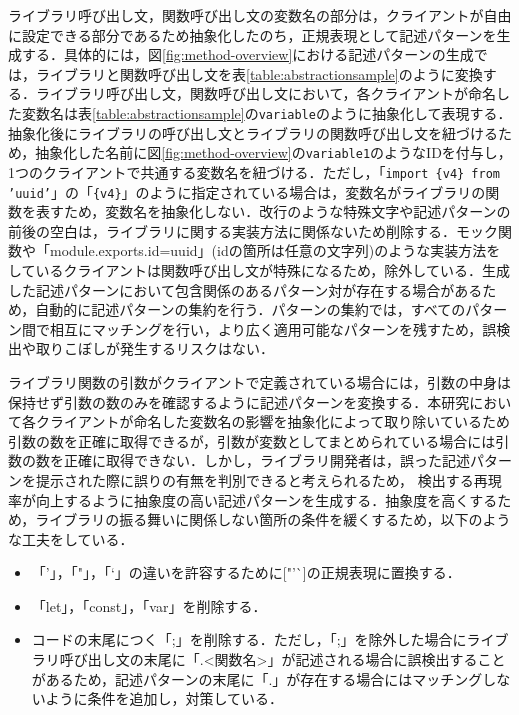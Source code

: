 \documentclass[11pt]{jreport}
\begin{document}
ライブラリ呼び出し文，関数呼び出し文の変数名の部分は，クライアントが自由に設定できる部分であるため抽象化したのち，正規表現として記述パターンを生成する．具体的には，図\ref{fig:method-overview}における記述パターンの生成では，ライブラリと関数呼び出し文を表\ref{table:abstractionsample}のように変換する．ライブラリ呼び出し文，関数呼び出し文において，各クライアントが命名した変数名は表\ref{table:abstractionsample}の\texttt{variable}のように抽象化して表現する．抽象化後にライブラリの呼び出し文とライブラリの関数呼び出し文を紐づけるため，抽象化した名前に図\ref{fig:method-overview}の\texttt{variable1}のようなIDを付与し，1つのクライアントで共通する変数名を紐づける．ただし，「\texttt{import \{v4\} from 'uuid'}」の「\texttt{\{v4\}}」のように指定されている場合は，変数名がライブラリの関数を表すため，変数名を抽象化しない．改行のような特殊文字や記述パターンの前後の空白は，ライブラリに関する実装方法に関係ないため削除する．モック関数や「module.exports.id=uuid」(idの箇所は任意の文字列)のような実装方法をしているクライアントは関数呼び出し文が特殊になるため，除外している．生成した記述パターンにおいて包含関係のあるパターン対が存在する場合があるため，自動的に記述パターンの集約を行う．パターンの集約では，すべてのパターン間で相互にマッチングを行い，より広く適用可能なパターンを残すため，誤検出や取りこぼしが発生するリスクはない．

ライブラリ関数の引数がクライアントで定義されている場合には，引数の中身は保持せず引数の数のみを確認するように記述パターンを変換する．本研究において各クライアントが命名した変数名の影響を抽象化によって取り除いているため引数の数を正確に取得できるが，引数が変数としてまとめられている場合には引数の数を正確に取得できない．しかし，ライブラリ開発者は，誤った記述パターンを提示された際に誤りの有無を判別できると考えられるため，
検出する再現率が向上するように抽象度の高い記述パターンを生成する．抽象度を高くするため，ライブラリの振る舞いに関係しない箇所の条件を緩くするため，以下のような工夫をしている．

\begin{itemize}
\item 「'」，「"」，「`」の違いを許容するために["'\`{}]の正規表現に置換する．
\item 「let」，「const」，「var」を削除する．
\item コードの末尾につく「;」を削除する．ただし，「;」を除外した場合にライブラリ呼び出し文の末尾に「.\textless{}関数名\textgreater{}」が記述される場合に誤検出することがあるため，記述パターンの末尾に「.」が存在する場合にはマッチングしないように条件を追加し，対策している．
\end{itemize}
\end{document}
